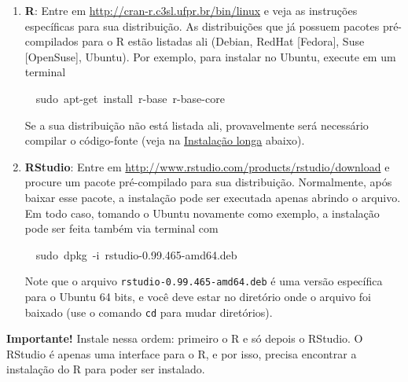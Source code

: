 \documentclass[a4paper,12pt]{article}\usepackage[]{graphicx}\usepackage[]{color}
\makeatletter
\newcommand{\hlnum}[1]{\textcolor[rgb]{0.686,0.059,0.569}{#1}}%
\newcommand{\hlopt}[1]{\textcolor[rgb]{0,0,0}{#1}}%
\newcommand{\hlstd}[1]{\textcolor[rgb]{0.345,0.345,0.345}{#1}}%
\newcommand{\hlkwc}[1]{\textcolor[rgb]{0.333,0.667,0.333}{#1}}%
\newenvironment{kframe}{%
 \def\at@end@of@kframe{}%
 \ifinner\ifhmode%
  \def\at@end@of@kframe{\end{minipage}}%
  \begin{minipage}{\columnwidth}%
 \fi\fi%
 \def\FrameCommand##1{\hskip\@totalleftmargin \hskip-\fboxsep
 \colorbox{shadecolor}{##1}\hskip-\fboxsep
     \hskip-\linewidth \hskip-\@totalleftmargin \hskip\columnwidth}%
 \MakeFramed {\advance\hsize-\width
   \@totalleftmargin\z@ \linewidth\hsize
   \@setminipage}}%
 {\par\unskip\endMakeFramed%
 \at@end@of@kframe}
\newenvironment{knitrout}{}{} %
\providecommand{\R}{\textsf{R}\xspace}
\providecommand{\RStudio}{\textsf{RStudio}\xspace}
\makeatother
\begin{document}
\begin{enumerate}
\item \textbf{\R}: Entre em \url{http://cran-r.c3sl.ufpr.br/bin/linux} e
  veja as instruções específicas para sua distribuição. As distribuições
  que já possuem pacotes pré-compilados para o \R estão listadas ali
  (Debian, RedHat [Fedora], Suse [OpenSuse], Ubuntu). Por exemplo, para
  instalar no Ubuntu, execute em um terminal
\begin{knitrout}\small
{}\color{fgcolor}\begin{kframe}
\noindent
\ttfamily
\hlstd{}\hlstd{\ \ }\hlstd{sudo\ apt{-}get\ }\hlkwc{install\ }\hlstd{r{-}base\ r{-}base{-}core}\hspace*{\fill}
\mbox{}
\normalfont
\normalsize
\end{kframe}
\end{knitrout}
  Se a sua distribuição não está listada ali, provavelmente será
  necessário compilar o código-fonte (veja na
  \hyperref[sec:ill]{Instalação longa} abaixo).
\item \textbf{\RStudio}: Entre em
  \url{http://www.rstudio.com/products/rstudio/download}
  e procure um pacote
  pré-compilado para sua distribuição. Normalmente, após baixar esse
  pacote, a instalação pode ser executada apenas abrindo o arquivo. Em
  todo caso, tomando o Ubuntu novamente como exemplo, a instalação pode
  ser feita também via terminal com
\begin{knitrout}\small
{}\color{fgcolor}\begin{kframe}
\noindent
\ttfamily
\hlstd{}\hlstd{\ \ }\hlstd{sudo\ dpkg\ }\hlopt{{-}}\hlstd{i\ rstudio{-}0.99}\hlnum{.465}\hlstd{}\hlopt{{-}}\hlstd{amd64.deb}\hspace*{\fill}
\mbox{}
\normalfont
\normalsize
\end{kframe}
\end{knitrout}
  Note que o arquivo \texttt{rstudio-0.99.465-amd64.deb} é uma versão
  específica para o Ubuntu 64 bits, e você deve estar no diretório onde
  o arquivo foi baixado (use o comando \texttt{cd} para mudar
  diretórios).

\end{enumerate}

\textbf{Importante!} Instale nessa ordem: primeiro o \R e só depois o
\RStudio. O \RStudio é apenas uma interface para o \R, e por isso,
precisa encontrar a instalação do \R para poder ser instalado.
\end{document}
